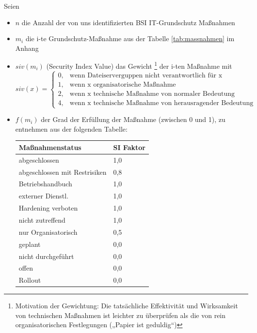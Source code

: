 Seien
\begin{itemize}
\item $n$ die Anzahl der von uns identifizierten BSI IT-Grundschutz Maßnahmen
\item $m_i$ die i-te Grundschutz-Maßnahme aus der Tabelle \ref{tab:massnahmen} im Anhang
\item $siv(m_i)$ (Security Index Value) das Gewicht \footnote{Motivation der Gewichtung: Die tatsächliche Effektivität und Wirksamkeit von technischen Maßnahmen ist leichter zu überprüfen als die von rein organisatorischen Festlegungen („Papier ist geduldig“)} der i-ten Maßnahme mit
\begin{equation}
siv(x)=
\begin{cases}
    0,& \text{wenn Dateiserverguppen nicht verantwortlich für x }\\
    1,& \text{wenn x organisatorische Maßnahme}\\
    2,& \text{wenn x technische Maßnahme von normaler Bedeutung}\\
    4,& \text{wenn x technische Maßnahme von herausragender Bedeutung}
\end{cases}
\end{equation}
\item $f(m_i)$ der Grad der Erfüllung der Maßnahme (zwischen 0 und 1), zu entnehmen aus der folgenden Tabelle: \\

\begin{minipage}{\textwidth}
\begin{center}
\begin{tabular}{ll}
\toprule
Maßnahmenstatus & SI Faktor \\
\midrule
abgeschlossen & 1,0 \\
abgeschlossen mit Restrisiken & 0,8 \\
Betriebshandbuch & 1,0 \\
externer Dienstl. & 1,0 \\
Hardening verboten & 1,0 \\
nicht zutreffend & 1,0 \\
nur Organisatorisch & 0,5 \\
geplant & 0,0 \\
nicht durchgeführt & 0,0 \\
offen & 0,0 \\
Rollout & 0,0  \\
\bottomrule
\end{tabular}
\end{center}
\end{minipage}
\end{itemize}
\bigskip

